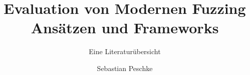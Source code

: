 \title{Evaluation von Modernen Fuzzing Ansätzen und Frameworks}
\subtitle{Eine Literaturübersicht}
\author{Sebastian Peschke}
\authornote{}
\authornotemark[1]
\renewcommand{\shortauthors}{Peschke}

